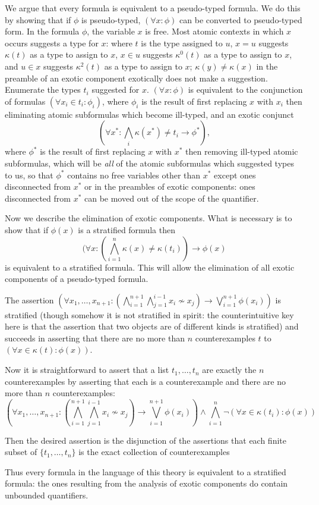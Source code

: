 \documentclass[12pt]{article}
\begin{document}
\begin{description}
We argue that every formula is equivalent to a pseudo-typed formula.  We do this by showing that if $\phi$ is pseudo-typed, $(\forall x:\phi)$ can be converted to pseudo-typed form.   In the formula $\phi$, the variable $x$ is free.  Most atomic contexts in which $x$ occurs suggests a type for $x$:  where $t$ is the type assigned to $u$, $x=u$ suggests $\kappa(t)$ as a type to assign to $x$, $x \in u$ suggests $\kappa^0(t)$ as a type to assign to $x$, and $u \in x$ suggests $\kappa^2(t)$ as a type to assign to $x$;  $\kappa(y)\neq  \kappa(x)$ in the preamble of an exotic component exotically does not make a suggestion.
Enumerate the types $t_i$ suggested for $x$.  $(\forall x:\phi)$ is equivalent to the conjunction of formulas $(\forall x_i \in t_i:\phi_i)$, where $\phi_i$ is the result of first replacing $x$ with $x_i$ then eliminating atomic subformulas
which become ill-typed, and an exotic conjunct $$(\forall x^*:\bigwedge_i \kappa(x^*) \neq t_i\rightarrow \phi^*),$$ where $\phi^*$ is the result of first replacing $x$ with $x^*$ then removing ill-typed atomic subformulas, which will be {\em all\/} of the atomic subformulas which suggested types to us, so that $\phi^*$ contains no free variables other than $x^*$ except ones disconnected from $x^*$ or  in the preambles of exotic components:  ones disconnected from $x^*$ can be moved out of the scope of the quantifier.

Now we describe the elimination of exotic components.  What is necessary is to show that if $\phi(x)$ is a stratified formula  then $$(\forall x:(\bigwedge_{i=1}^n \kappa(x) \neq \kappa(t_i))\rightarrow \phi(x)$$ is equivalent to a stratified formula.  This will allow the elimination of all exotic components of a pseudo-typed formula.

The assertion $(\forall x_1,\ldots,x_{n+1}: (\bigwedge_{i=1}^{n+1} \bigwedge_{j=1}^{i-1} x_i \not\sim x_j) \rightarrow \bigvee_{i=1}^{n+1}\phi(x_i))$ is stratified (though somehow it is not stratified in spirit:  the counterintuitive key here is that the assertion that two objects are of different kinds is stratified) and succeeds in asserting that there are no more than $n$ counterexamples $t$ to \newline $(\forall x \in \kappa(t):\phi(x))$.

Now it is straightforward to assert that a list $t_1,\ldots,t_n$ are exactly the $n$ counterexamples by asserting that each is a counterexample and there are no more than $n$ counterexamples:   $$(\forall x_1,\ldots,x_{n+1}: (\bigwedge_{i=1}^{n+1} \bigwedge_{j=1}^{i-1} x_i \not\sim x_j) \rightarrow \bigvee_{i=1}^{n+1}\phi(x_i))\wedge \bigwedge_{i=1}^n \neg(\forall x \in \kappa(t_i):\phi(x))$$

Then the desired assertion is the disjunction of the assertions that each finite subset of $\{t_1,\ldots,t_n\}$ is the exact collection of counterexamples

Thus every formula in the language of this theory is equivalent to a stratified formula:  the ones resulting from the analysis of exotic components do contain unbounded quantifiers.

\end{description}
\end{document}
